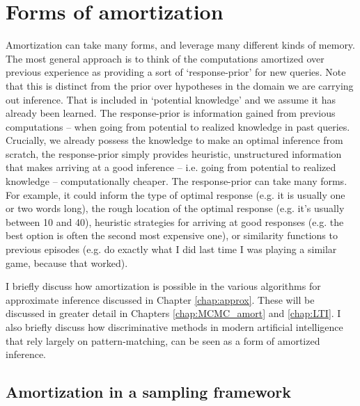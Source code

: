 
\section{Forms of amortization}

Amortization can take many forms, and leverage many different kinds of memory. The most general approach is to think of the computations amortized over previous experience as providing a sort of `response-prior' for new queries. Note that this is distinct from the prior over hypotheses in the domain we are carrying out inference. That is included in `potential knowledge' and we assume it has already been learned. The response-prior is information gained from previous computations -- when going from potential to realized knowledge in past queries. Crucially, we already possess the knowledge to make an optimal inference from scratch, the response-prior simply provides heuristic, unstructured information that makes arriving at a good inference -- i.e. going from potential to realized knowledge -- computationally cheaper. The response-prior can take many forms. For example, it could inform the type of optimal response (e.g. it is usually one or two words long), the rough location of the optimal response (e.g. it's usually between 10 and 40), heuristic strategies for arriving at good responses (e.g. the best option is often the second most expensive one), or similarity functions to previous episodes (e.g. do exactly what I did last time I was playing a similar game, because that worked). 

I briefly discuss how amortization is possible in the various algorithms for approximate inference discussed in Chapter \ref{chap:approx}. These will be discussed in greater detail in Chapters \ref{chap:MCMC_amort} and \ref{chap:LTI}. I also briefly discuss how discriminative methods in modern artificial intelligence that rely largely on pattern-matching, can be seen as a form of amortized inference.

\subsection{Amortization in a sampling framework} 

